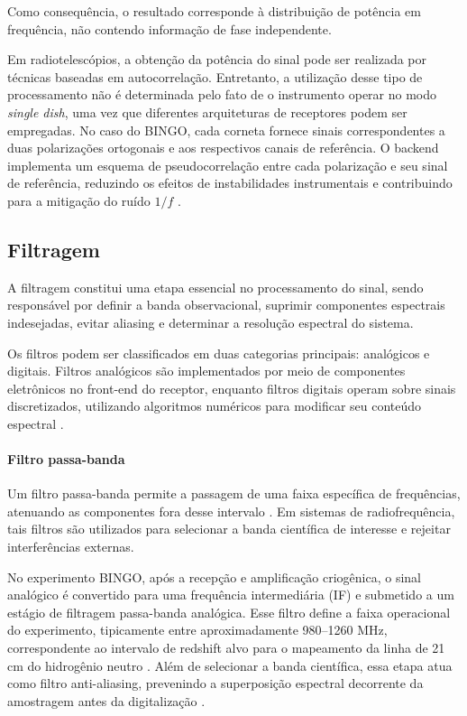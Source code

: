 \begin{itemize}
Como consequência, o resultado corresponde à distribuição de potência em frequência, não contendo informação de fase independente.

Em radiotelescópios, a obtenção da potência do sinal pode ser realizada por técnicas baseadas em autocorrelação. Entretanto, a utilização desse tipo de processamento não é determinada pelo fato de o instrumento operar no modo \textit{single dish}, uma vez que diferentes arquiteturas de receptores podem ser empregadas. No caso do BINGO, cada corneta fornece sinais correspondentes a duas polarizações ortogonais e aos respectivos canais de referência. O backend implementa um esquema de pseudocorrelação entre cada polarização e seu sinal de referência, reduzindo os efeitos de instabilidades instrumentais e contribuindo para a mitigação do ruído \(1/f\) \cite{guillen2023_bingo,wuensche2022bingoII}.
\end{itemize}

\subsection{Filtragem}

A filtragem constitui uma etapa essencial no processamento do sinal, sendo responsável por definir a banda observacional, suprimir componentes espectrais indesejadas, evitar aliasing e determinar a resolução espectral do sistema.

Os filtros podem ser classificados em duas categorias principais: analógicos e digitais. Filtros analógicos são implementados por meio de componentes eletrônicos no front-end do receptor, enquanto filtros digitais operam sobre sinais discretizados, utilizando algoritmos numéricos para modificar seu conteúdo espectral \cite{MarcelobjApostilaPDS}.

\paragraph{Filtro passa-banda}

Um filtro passa-banda permite a passagem de uma faixa específica de frequências, atenuando as componentes fora desse intervalo \cite{Pimental2022}. Em sistemas de radiofrequência, tais filtros são utilizados para selecionar a banda científica de interesse e rejeitar interferências externas.


No experimento BINGO, após a recepção e amplificação criogênica, o sinal analógico é convertido para uma frequência intermediária (IF) e submetido a um estágio de filtragem passa-banda analógica. Esse filtro define a faixa operacional do experimento, tipicamente entre aproximadamente 980–1260 MHz, correspondente ao intervalo de redshift alvo para o mapeamento da linha de 21 cm do hidrogênio neutro \cite{Wuensche2022}. Além de selecionar a banda científica, essa etapa atua como filtro anti-aliasing, prevenindo a superposição espectral decorrente da amostragem antes da digitalização \cite{MarcelobjApostilaPDS}.

